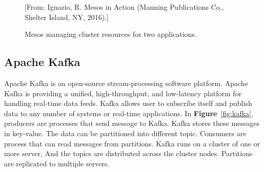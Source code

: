 \documentclass[12pt,oneside,openright,a4paper]{cpe-english-project}
\begin{document}
\begin{figure}[!h]\centering
  \setlength{\fboxrule}{0mm} %
  \setlength{\fboxsep}{0cm}
  \caption{Mesos managing cluster resources for two applications.}\label{fig:spark}
  [From: Ignazio, R. Mesos in Action (Manning Publications Co., Shelter Island, NY, 2016).]
\end{figure}

\subsection{Apache Kafka}
\hspace{10mm}Apache Kafka is an open-source stream-processing software platform. Apache Kafka is providing a unified, high-throughput, and low-latency platform for handling real-time data feeds. Kafka allows user to subscribe itself and publish data to any number of systems or real-time applications. In \textbf{Figure}~\ref{fig:kafka}, producers are processes that send message to Kafka. Kafka stores these messages in key-value. The data can be partitioned into different topic. Consumers are process that can read messages from partitions. Kafka runs on a cluster of one or more server, And the topics are distributed across the cluster nodes. Partitions are replicated to multiple servers.\cite{kafka}
\end{document}
